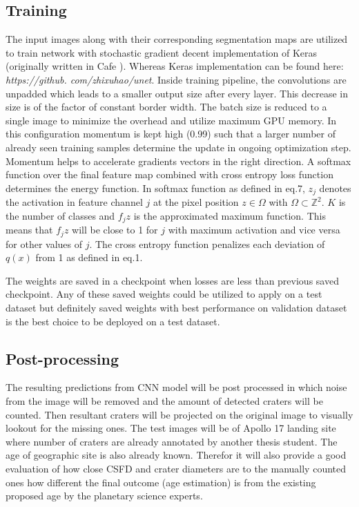 \documentclass[11pt]{article}
\begin{document}
\subsection{Training}
The input images along with their corresponding segmentation maps are utilized to train network with stochastic gradient decent implementation of Keras (originally written in Cafe \cite{ronneberger2015u}). Whereas Keras implementation can be found here:
\textit{https://github.
	com/zhixuhao/unet}. Inside training pipeline, the convolutions are unpadded which leads to a smaller output size after every layer. This decrease in size is of the factor of constant border width. The batch size is reduced to a single image to minimize the overhead and utilize maximum GPU memory. In this configuration momentum is kept high (0.99) such that a larger number of already seen training samples determine the update in ongoing optimization step. Momentum helps to accelerate gradients vectors in the right direction. A softmax function over the final feature map combined with cross entropy loss function determines the energy function. In softmax function as defined in eq.7, $z_{j}$ denotes the activation in feature channel $j$ at the pixel position $z \in \Omega$ with $\Omega \subset \mathbb{Z}^{2}$. $K$ is the number of classes and $f_jz$ is the approximated maximum function. This means that $f_jz$ will be close to 1 for $j$ with maximum activation and vice versa for other values of $j$. The cross entropy function penalizes each deviation of $q(x)$ from 1 as defined in eq.1.

The weights are saved in a checkpoint when losses are less than previous saved checkpoint. Any of these saved weights could be utilized to apply on a test dataset but definitely saved weights with best performance on validation dataset is the best choice to be deployed on a test dataset.

\subsection{Post-processing}
The resulting predictions from CNN model will be post processed in which noise from the image will be removed and the amount of detected craters will be counted. Then resultant craters will be projected on the original image to visually lookout for the missing ones. The test images will be of Apollo 17 landing site where number of craters are already annotated by another thesis student. The age of geographic site is also already known. Therefor it will also provide a good evaluation of how close CSFD and crater diameters are to the manually counted ones how different the final outcome (age estimation) is from the existing proposed age by the planetary science experts. 
\end{document}

